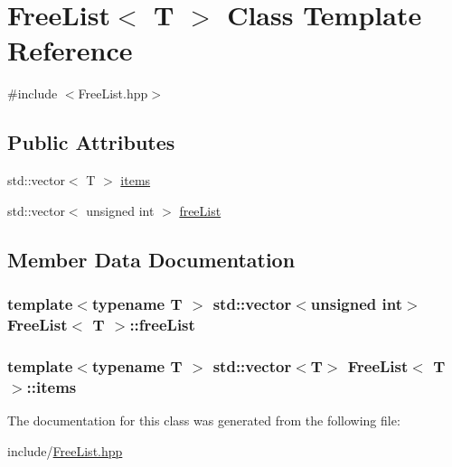 \hypertarget{classFreeList}{\section{Free\-List$<$ T $>$ Class Template Reference}
\label{classFreeList}
}


{\ttfamily \#include $<$Free\-List.\-hpp$>$}

\subsection*{Public Attributes}
\begin{DoxyCompactItemize}
\item 
std\-::vector$<$ T $>$ \hyperlink{classFreeList_abc532f54d9ea7ef275782aee5710575a}{items}
\item 
std\-::vector$<$ unsigned int $>$ \hyperlink{classFreeList_a9545410d697ee9250ee7d26ef30c4c17}{free\-List}
\end{DoxyCompactItemize}


\subsection{Member Data Documentation}
\hypertarget{classFreeList_a9545410d697ee9250ee7d26ef30c4c17}{
\subsubsection[{free\-List}]{\setlength{\rightskip}{0pt plus 5cm}template$<$typename T $>$ std\-::vector$<$unsigned int$>$ {\bf Free\-List}$<$ T $>$\-::free\-List}}\label{classFreeList_a9545410d697ee9250ee7d26ef30c4c17}
\hypertarget{classFreeList_abc532f54d9ea7ef275782aee5710575a}{
\subsubsection[{items}]{\setlength{\rightskip}{0pt plus 5cm}template$<$typename T $>$ std\-::vector$<$T$>$ {\bf Free\-List}$<$ T $>$\-::items}}\label{classFreeList_abc532f54d9ea7ef275782aee5710575a}


The documentation for this class was generated from the following file\-:\begin{DoxyCompactItemize}
\item 
include/\hyperlink{FreeList_8hpp}{Free\-List.\-hpp}\end{DoxyCompactItemize}
